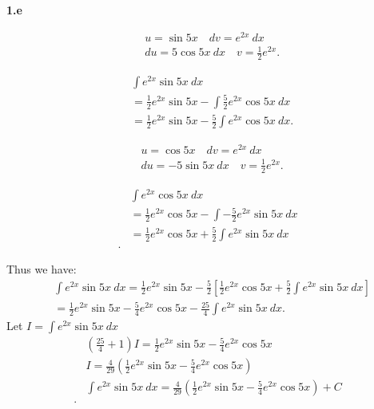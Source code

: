 \documentclass{report}
\begin{document}
    \bigbreak \noindent 
    \textbf{1.e}
    \bigbreak \noindent 
    \begin{minipage}[t]{0.47\textwidth}
        \begin{align*}
            &u = \sin{5x} \quad dv = e^{2x}\ dx \\
            &du = 5\cos{5x}\ dx \quad v = \frac{1}{2}e^{2x}
        .\end{align*}
    \end{minipage}
    \begin{minipage}[t]{0.47\textwidth}
        \begin{align*}
            &\int e^{2x}\sin{5x}\ dx \\
            &=\frac{1}{2}e^{2x}\sin{5x} - \int \frac{5}{2}e^{2x}\cos{5x}\ dx \\
            &=\frac{1}{2}e^{2x}\sin{5x} - \frac{5}{2}\int e^{2x}\cos{5x}\ dx
        .\end{align*}
    \end{minipage}
    \bigbreak \noindent 
    \begin{minipage}[t]{0.47\textwidth}
        \begin{align*}
            &u = \cos{5x} \quad dv = e^{2x}\ dx \\
            &du = -5\sin{5x}\ dx \quad v = \frac{1}{2}e^{2x}
        .\end{align*}
    \end{minipage}
    \begin{minipage}[t]{0.47\textwidth}
        \begin{align*}
            &\int e^{2x}\cos{5x}\ dx \\
            &=\frac{1}{2}e^{2x}\cos{5x} - \int -\frac{5}{2}e^{2x}\sin{5x}\ dx \\
            &=\frac{1}{2}e^{2x}\cos{5x} + \frac{5}{2}\int e^{2x}\sin{5x}\ dx \\
        .\end{align*}
    \end{minipage}
    \bigbreak \noindent 
    Thus we have:
    \begin{align*}
        &\int e^{2x}\sin{5x}\ dx = \frac{1}{2}e^{2x}\sin{5x} - \frac{5}{2}\left[\frac{1}{2}e^{2x}\cos{5x}+\frac{5}{2}\int e^{2x}\sin{5x}\ dx\right] \\
        &=\frac{1}{2}e^{2x}\sin{5x} -\frac{5}{4}e^{2x}\cos{5x} - \frac{25}{4}\int e^{2x}\sin{5x}\ dx
    .\end{align*}
    \bigbreak \noindent 
    Let $I = \int e^{2x}\sin{5x}\ dx$
    \begin{align*}
        &\left(\frac{25}{4} +1\right) I = \frac{1}{2}e^{2x}\sin{5x} -\frac{5}{4}e^{2x}\cos{5x} \\
        &I = \frac{4}{29}\left(\frac{1}{2}e^{2x}\sin{5x} -\frac{5}{4}e^{2x}\cos{5x}\right) \\
        &\int e^{2x}\sin{5x}\ dx = \frac{4}{29}\left(\frac{1}{2}e^{2x}\sin{5x} -\frac{5}{4}e^{2x}\cos{5x}\right)  + C\\
    .\end{align*}
\end{document}
